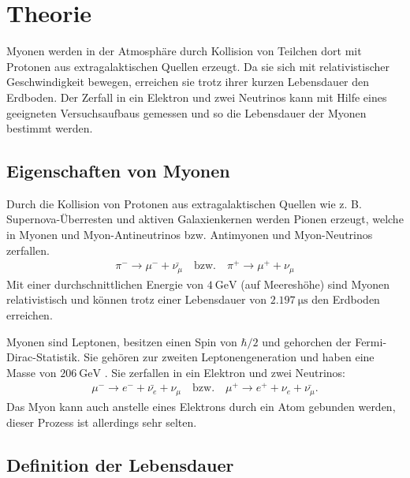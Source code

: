 \section{Theorie}

Myonen werden in der Atmosphäre durch Kollision von Teilchen dort mit Protonen aus extragalaktischen Quellen erzeugt. Da sie sich mit relativistischer Geschwindigkeit bewegen, erreichen sie trotz ihrer kurzen Lebensdauer den Erdboden. Der Zerfall in ein Elektron und zwei Neutrinos kann mit Hilfe eines geeigneten Versuchsaufbaus gemessen und so die Lebensdauer der Myonen bestimmt werden.

\subsection{Eigenschaften von Myonen}

Durch die Kollision von Protonen aus extragalaktischen Quellen wie z. B. Supernova-Überresten und aktiven Galaxienkernen werden Pionen erzeugt, welche in Myonen und Myon-Antineutrinos bzw. Antimyonen und Myon-Neutrinos zerfallen.
\begin{align}
	\pi^- \to \mu^- + \bar{\nu_\mu} \quad \text{bzw.} \quad \pi^+ \to \mu^+ + \nu_\mu
\end{align}
Mit einer durchschnittlichen Energie von $\SI{4}{\giga\electronvolt}$ (auf Meereshöhe) \cite{PDG} sind Myonen relativistisch und können trotz einer Lebensdauer von $\SI{2.197}{\micro\second}$ \cite{PDG} den Erdboden erreichen.\par
Myonen sind Leptonen, besitzen einen Spin von $\hbar/2$ und gehorchen der Fermi-Dirac-Statistik. Sie gehören zur zweiten Leptonengeneration und haben eine Masse von $\SI{206}{\giga\electronvolt}$ \cite{PDG}. Sie zerfallen in ein Elektron und zwei Neutrinos:
\begin{align}
	\mu^- \to e^- + \bar{\nu_e} + \nu_\mu \quad \text{bzw.} \quad \mu^+ \to e^+ + \nu_e + \bar{\nu_\mu}.
\end{align}
Das Myon kann auch anstelle eines Elektrons durch ein Atom gebunden werden, dieser Prozess ist allerdings sehr selten.

\subsection{Definition der Lebensdauer}


